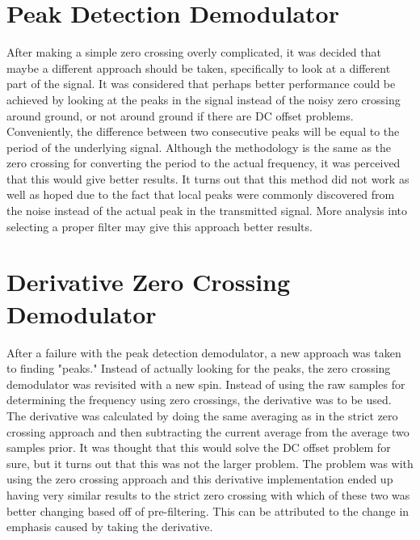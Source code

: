 \section{Peak Detection Demodulator}
After making a simple zero crossing overly complicated, it was decided that maybe a different approach should be taken, specifically to look at a different part of the signal. It was considered that perhaps better performance could be achieved by looking at the peaks in the signal instead of the noisy zero crossing around ground, or not around ground if there are DC offset problems. Conveniently, the difference between two consecutive peaks will be equal to the period of the underlying signal. Although the methodology is the same as the zero crossing for converting the period to the actual frequency, it was perceived that this would give better results. It turns out that this method did not work as well as hoped due to the fact that local peaks were commonly discovered from the noise instead of the actual peak in the transmitted signal. More analysis into selecting a proper filter may give this approach better results.

\section{Derivative Zero Crossing Demodulator}
After a failure with the peak detection demodulator, a new approach was taken to finding "peaks." Instead of actually looking for the peaks, the zero crossing demodulator was revisited with a new spin. Instead of using the raw samples for determining the frequency using zero crossings, the derivative was to be used. The derivative was calculated by doing the same averaging as in the strict zero crossing approach and then subtracting the current average from the average two samples prior. It was thought that this would solve the DC offset problem for sure, but it turns out that this was not the larger problem. The problem was with using the zero crossing approach and this derivative implementation ended up having very similar results to the strict zero crossing with which of these two was better changing based off of pre-filtering. This can be attributed to the change in emphasis caused by taking the derivative. 

